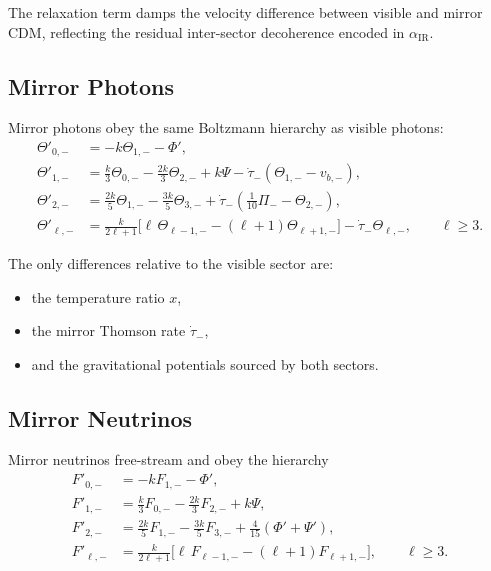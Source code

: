 \documentclass[11pt,a4paper]{article}
\begin{document}
The relaxation term damps the velocity difference between visible and mirror CDM, reflecting
the residual inter-sector decoherence encoded in $\alpha_{\mathrm{IR}}$.

\subsection{Mirror Photons}

Mirror photons obey the same Boltzmann hierarchy as visible photons:
\begin{align}
    \Theta'_{0,-} &= -k\Theta_{1,-} - \Phi', \\
    \Theta'_{1,-} &= \frac{k}{3}\Theta_{0,-} - \frac{2k}{3}\Theta_{2,-}
                    + k\Psi - \dot{\tau}_{-}(\Theta_{1,-} - v_{b,-}), \\
    \Theta'_{2,-} &= \frac{2k}{5}\Theta_{1,-} - \frac{3k}{5}\Theta_{3,-}
                    + \dot{\tau}_{-}\left(\frac{1}{10}\Pi_{-} - \Theta_{2,-}\right), \\
    \Theta'_{\ell,-} &= \frac{k}{2\ell+1}\bigl[\ell\,\Theta_{\ell-1,-}
                      - (\ell+1)\Theta_{\ell+1,-}\bigr]
                      - \dot{\tau}_{-}\Theta_{\ell,-}, \qquad \ell \ge 3.
\end{align}

The only differences relative to the visible sector are:

\begin{itemize}
    \item the temperature ratio $x$,
    \item the mirror Thomson rate $\dot{\tau}_{-}$,
    \item and the gravitational potentials sourced by both sectors.
\end{itemize}

\subsection{Mirror Neutrinos}

Mirror neutrinos free-stream and obey the hierarchy
\begin{align}
    F'_{0,-} &= -kF_{1,-} - \Phi', \\
    F'_{1,-} &= \frac{k}{3}F_{0,-} - \frac{2k}{3}F_{2,-} + k\Psi, \\
    F'_{2,-} &= \frac{2k}{5}F_{1,-} - \frac{3k}{5}F_{3,-}
               + \frac{4}{15}(\Phi' + \Psi'), \\
    F'_{\ell,-} &= \frac{k}{2\ell+1}\bigl[\ell\,F_{\ell-1,-}
                 - (\ell+1)F_{\ell+1,-}\bigr], \qquad \ell \ge 3.
\end{align}
\end{document}
